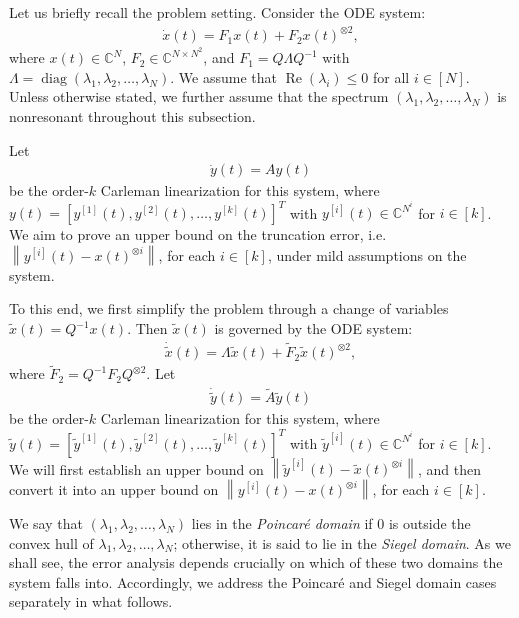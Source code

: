 \documentclass[superscriptaddress,onecolumn,nofootinbib,longbibliography,a4paper,accepted=2026-09-29]{quantumarticle}
\theoremstyle{plain}
\theoremstyle{definition}
\numberwithin{thm}{section}
\numberwithin{assumption}{section}
\numberwithin{lemma}{section}
\numberwithin{prop}{section}
\numberwithin{cor}{section}
\numberwithin{definition}{section}
\numberwithin{rmk}{section}
\numberwithin{equation}{section}
\newcommand{\norm}[1]     {\left\| #1 \right\|}
\newcommand{\myC}{\mathbb{C}}
\begin{document}
Let us briefly recall the problem setting. Consider the ODE system:
\begin{align}
\dot{x}(t) = F_1 x(t) + F_2 x(t)^{\otimes 2},    
\label{eq:general_ode_system2}
\end{align}
where $x(t) \in \mathbb{C}^N$, $F_2 \in \mathbb{C}^{N \times N^2}$, and $F_1 = Q \Lambda Q^{-1}$ with $\Lambda = \operatorname{diag}(\lambda_1, \lambda_2, \dots, \lambda_N)$. We assume that $\operatorname{Re}(\lambda_i) \le 0$ for all $i \in [N]$. Unless otherwise stated, we further assume that the spectrum $(\lambda_1, \lambda_2, \dots, \lambda_N)$ is nonresonant throughout this subsection.

Let 
\begin{align}
\dot{y}(t) =Ay(t)    
\end{align}
be the order-$k$ Carleman linearization for this system, where $y(t)=[y^{[1]}(t), y^{[2]}(t),\dots,y^{[k]}(t)]^T$ with $y^{[i]}(t) \in \myC^{N^i}$ for $i \in [k]$. We aim to prove an upper bound on the truncation error, i.e. $\norm{y^{[i]}(t)-x(t)^{\otimes i}}$, for each $i \in [k]$, under mild assumptions on the system.  

To this end, we first simplify the problem through a change of variables $\tilde{x}(t)=Q^{-1}x(t)$. Then $\tilde{x}(t)$ is governed by the ODE system:
\begin{align}
\dot{\tilde{x}}(t) = \Lambda \tilde{x}(t) + \tilde{F}_2 \tilde{x}(t)^{\otimes 2},   
\label{eq:simple_ode_system2}
\end{align}
where $\tilde{F}_2 = Q^{-1}F_2 Q^{\otimes 2}$. Let 
\begin{align}
\dot{\tilde{y}}(t) =\tilde{A}\tilde{y}(t)    
\end{align}
be the order-$k$ Carleman linearization for this system, where $\tilde{y}(t)=[\tilde{y}^{[1]}(t), \tilde{y}^{[2]}(t),\dots,\tilde{y}^{[k]}(t)]^T$ with $\tilde{y}^{[i]}(t) \in \myC^{N^i}$ for $i \in [k]$. We will first establish an upper bound on $\norm{\tilde{y}^{[i]}(t)-\tilde{x}(t)^{\otimes i}}$, and then convert it into an upper bound on $\norm{y^{[i]}(t)-x(t)^{\otimes i}}$, for each $i \in [k]$.

We say that $(\lambda_1, \lambda_2, \dots, \lambda_N)$ lies in the \emph{Poincar\'{e} domain} if $0$ is outside the convex hull of $\lambda_1, \lambda_2, \dots, \lambda_N$; otherwise, it is said to lie in the \emph{Siegel domain}. As we shall see, the error analysis depends crucially on which of these two domains the system falls into. Accordingly, we address the Poincar\'{e} and Siegel domain cases separately in what follows.
\end{document}
